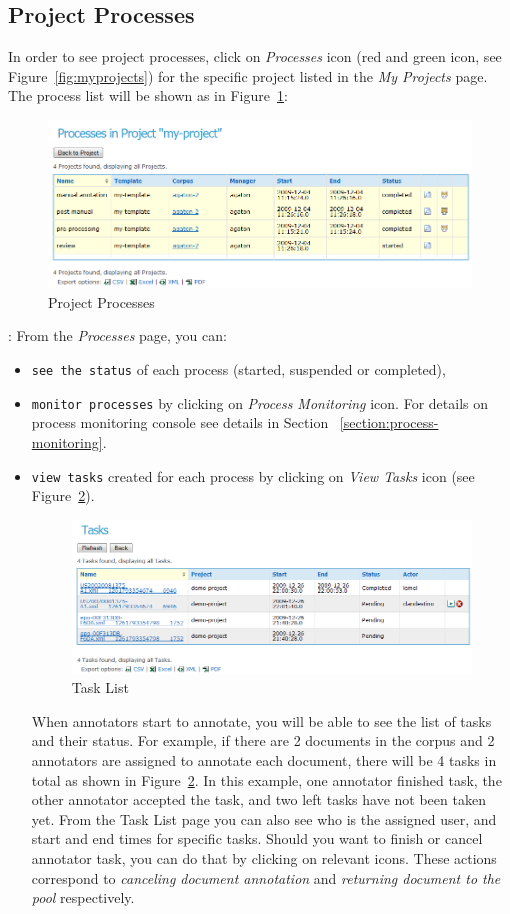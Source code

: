 \subsection{Project Processes}
In order to see project processes, click on \emph{Processes} icon (red and 
green icon, see Figure~\ref{fig:myprojects}) for the specific project listed in
the \emph{My Projects} page.
The process list will be shown as in Figure~\ref{fig:processesinproject}:
\begin{figure}[htb]
\centering
\includegraphics[scale=0.4]{processesinproject}
\caption{Project Processes}
\label{fig:processesinproject}
\end{figure}:
From the \emph{Processes} page, you can:
\begin{itemize}
  \item \texttt{see the status} of each process (started, suspended or
completed),
  \item \texttt{monitor processes} by clicking on \emph{Process Monitoring}
icon. For
details on process monitoring console see details in Section
~\ref{section:process-monitoring}.
  \item \texttt{view tasks} created for each process by clicking on \emph{View
Tasks} icon (see Figure~\ref{fig:taskinstances}).
\begin{figure}[htb]
\centering
\includegraphics[scale=0.4]{taskinstances}
\caption{Task List}
\label{fig:taskinstances}
\end{figure}
When annotators start to annotate, you will be able to see the list of tasks and
their status. For example, if there are 2
documents in the corpus and 2 annotators are assigned to annotate each document,
there will be 4 tasks in total as shown in Figure~\ref{fig:taskinstances}.
In this example, one annotator finished task, the other annotator accepted the task,
and two left tasks have not been taken yet.
From the Task List page you can also see who is the assigned user, and start and
end times for specific tasks.
Should you want to finish or cancel annotator task, you can do that by
clicking on relevant icons. These actions correspond to \emph{canceling
document annotation} and \emph{returning document to the pool} respectively.
\end{itemize}

